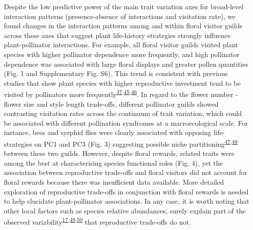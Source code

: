 \documentclass[12pt,a4paper,]{article}
\begin{document}
Despite the low predictive power of the main trait variation axes for
broad-level interaction patterns (presence-absence of interactions and
visitation rate), we found changes in the interaction patterns among and
within floral visitor guilds across these axes that suggest plant
life-history strategies strongly influence plant-pollinator
interactions. For example, all floral visitor guilds visited plant
species with higher pollinator dependence more frequently, and high
pollinator dependence was associated with large floral displays and
greater pollen quantities (Fig. 1 and Supplementary Fig. S6). This trend
is consistent with previous studies that show plant species with higher
reproductive investment tend to be visited by pollinators more
frequently\textsuperscript{\protect\hyperlink{ref-lazaro2013}{37},\protect\hyperlink{ref-hegland2005}{45},\protect\hyperlink{ref-kaiser2014}{46}}.
In regard to the flower number - flower size and style length
trade-offs, different pollinator guilds showed contrasting visitation
rates across the continuum of trait variation, which could be associated
with different pollination syndromes at a macroecological scale. For
instance, bees and syrphid flies were clearly associated with opposing
life-strategies on PC1 and PC3 (Fig. 3) suggesting possible niche
partitioning\textsuperscript{\protect\hyperlink{ref-palmer2003}{47},\protect\hyperlink{ref-phillips2020}{48}}
between these two guilds. However, despite floral rewards, related
traits were among the best at characterising species functional roles
(Fig. 4), yet the association between reproductive trade-offs and floral
visitors did not account for floral rewards because there was
insufficient data available. More detailed exploration of reproductive
trade-offs in conjunction with floral rewards is needed to help
elucidate plant-pollinator associations. In any case, it is worth noting
that other local factors such as species relative abundances, surely
explain part of the observed
variability\textsuperscript{\protect\hyperlink{ref-bartomeus2016}{17},\protect\hyperlink{ref-vazquez2007}{49},\protect\hyperlink{ref-encinas2012}{50}}
that reproductive trade-offs do not.
\end{document}
